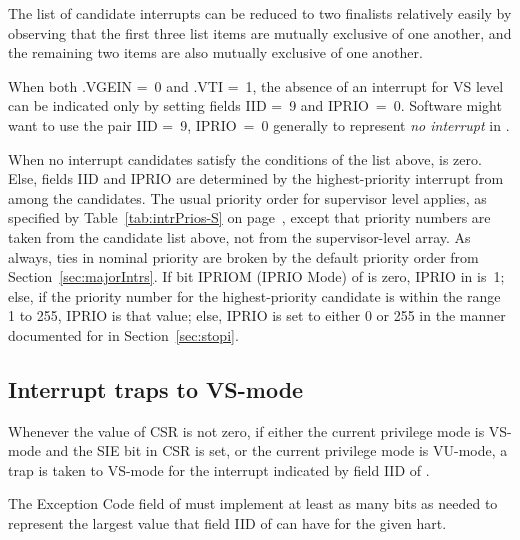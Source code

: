 \begin{commentary}
The list of candidate interrupts can be reduced to two finalists
relatively easily by observing that the first three list items are
mutually exclusive of one another, and the remaining two items are also
mutually exclusive of one another.
\end{commentary}

\begin{commentary}
When both .VGEIN =~0 and .VTI =~1, the
absence of an interrupt for VS level can be indicated only by setting
 fields IID =~9 and IPRIO~=~0.
Software might want to use the pair IID =~9, IPRIO~=~0 generally to
represent\/ \emph{no interrupt} in .
\end{commentary}

When no interrupt candidates satisfy the conditions of the list above,
 is zero.
Else,  fields IID and IPRIO are determined by the
highest-priority interrupt from among the candidates.
The usual priority order for supervisor level applies, as specified by
Table~\ref{tab:intrPrios-S} on page~\pageref{tab:intrPrios-S}, except
that priority numbers are taken from the candidate list above, not from
the supervisor-level  array.
As always, ties in nominal priority are broken by the default priority
order from Section~\ref{sec:majorIntrs}.
If bit IPRIOM (IPRIO Mode) of  is zero,
IPRIO in  is~1;
else, if the priority number for the highest-priority candidate is within the
range 1 to 255, IPRIO is that value;
else, IPRIO is set to either 0 or 255 in the manner documented
for  in Section~\ref{sec:stopi}.

\subsection{Interrupt traps to \mbox{VS-mode}}

Whenever the value of CSR  is not zero, if either the current
privilege mode is \mbox{VS-mode} and the SIE bit in CSR 
is set, or the current privilege mode is \mbox{VU-mode}, a trap is
taken to \mbox{VS-mode} for the interrupt indicated by field IID of
.

The Exception Code field of  must implement at least as
many bits as needed to represent the largest value that field IID of
 can have for the given hart.

